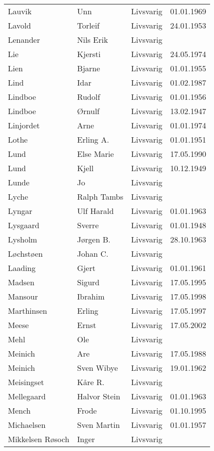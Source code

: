 \begin{longtable}{llll}
Lauvik	&	Unn	&	Livsvarig 	&	01.01.1969	\\
Lavold	&	Torleif	&	Livsvarig 	&	24.01.1953	\\
Lenander	&	Nils Erik	&	Livsvarig 	&		\\
Lie	&	Kjersti	&	Livsvarig 	&	24.05.1974	\\
Lien	&	Bjarne	&	Livsvarig 	&	01.01.1955	\\
Lind	&	Idar	&	Livsvarig 	&	01.02.1987	\\
Lindboe	&	Rudolf	&	Livsvarig 	&	01.01.1956	\\
Lindboe	&	Ørnulf	&	Livsvarig 	&	13.02.1947	\\
Linjordet	&	Arne	&	Livsvarig 	&	01.01.1974	\\
Lothe	&	Erling A.	&	Livsvarig 	&	01.01.1951	\\
Lund	&	Else Marie	&	Livsvarig 	&	17.05.1990	\\
Lund	&	Kjell	&	Livsvarig 	&	10.12.1949	\\
Lunde	&	Jo	&	Livsvarig 	&		\\
Lyche	&	Ralph Tambs	&	Livsvarig 	&		\\
Lyngar	&	Ulf Harald	&	Livsvarig 	&	01.01.1963	\\
Lysgaard	&	Sverre	&	Livsvarig 	&	01.01.1948	\\
Lysholm	&	Jørgen B.	&	Livsvarig 	&	28.10.1963	\\
Løchstøen	&	Johan C.	&	Livsvarig 	&		\\
Laading	&	Gjert	&	Livsvarig 	&	01.01.1961	\\
Madsen 	&	Sigurd 	&	Livsvarig 	&	17.05.1995	\\
Mansour 	&	Ibrahim	&	Livsvarig	&	17.05.1998	\\
Marthinsen 	&	Erling	&	Livsvarig	&	17.05.1997	\\
Meese 	&	Ernst	&	Livsvarig	&	17.05.2002	\\
Mehl	&	Ole	&	Livsvarig 	&		\\
Meinich	&	Are	&	Livsvarig 	&	17.05.1988	\\
Meinich	&	Sven Wibye	&	Livsvarig 	&	19.01.1962	\\
Meisingset	&	Kåre R.	&	Livsvarig 	&		\\
Mellegaard	&	Halvor Stein	&	Livsvarig 	&	01.01.1963	\\
Mench 	&	Frode	&	Livsvarig	&	01.10.1995	\\
Michaelsen	&	Sven Martin	&	Livsvarig 	&	01.01.1957	\\
Mikkelsen Røsoch	&	Inger	&	Livsvarig 	&		\\

\end{longtable}
